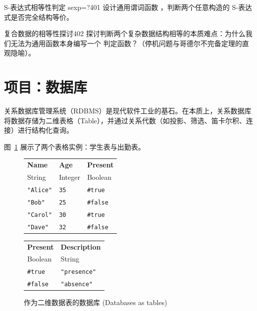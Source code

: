 \begin{exercise}{S-表达式相等性判定 sexp=?}{401}
设计通用谓词函数 ，判断两个任意构造的 S-表达式是否完全结构等价。
\end{exercise}

\begin{exercise}{复合数据的相等性探讨}{402}
探讨判断两个复杂数据结构相等的本质难点：为什么我们无法为通用函数本身编写一个  判定函数？（停机问题与哥德尔不完备定理的直观隐喻）。
\end{exercise}

\section{项目：数据库 }
\label{sec:23.7_database}

关系数据库管理系统（RDBMS）是现代软件工业的基石。在本质上，关系数据库将数据存储为二维表格（Table），并通过关系代数（如投影、筛选、笛卡尔积、连接）进行结构化查询。

图~\ref{fig:137} 展示了两个表格实例：学生表与出勤表。

\begin{figure}[htbp]
  \centering
\begin{stepperbox}[unbreakable]
  \centering\scriptsize
  \begin{tabular}[t]{@{}lll@{}}
    \toprule
    \textbf{Name} & \textbf{Age} & \textbf{Present} \\
    String & Integer & Boolean \\
    \midrule
    \texttt{"Alice"} & \texttt{35} & \texttt{\#true} \\
    \texttt{"Bob"}   & \texttt{25} & \texttt{\#false} \\
    \texttt{"Carol"} & \texttt{30} & \texttt{\#true} \\
    \texttt{"Dave"}  & \texttt{32} & \texttt{\#false} \\
    \bottomrule
  \end{tabular}%
  \hspace{1.2em}%
  \begin{tabular}[t]{@{}ll@{}}
    \toprule
    \textbf{Present} & \textbf{Description} \\
    Boolean & String \\
    \midrule
    \texttt{\#true}  & \texttt{"presence"} \\
    \texttt{\#false} & \texttt{"absence"} \\
    \bottomrule
  \end{tabular}
\end{stepperbox}
  \caption{作为二维数据表的数据库 (Databases as tables)}
  \label{fig:137}
\end{figure}

